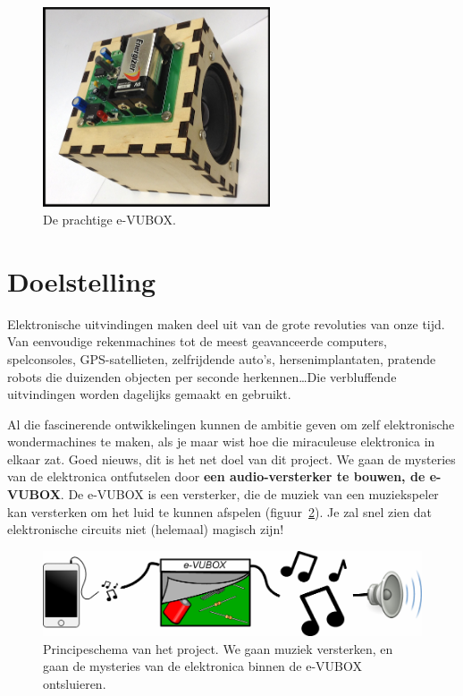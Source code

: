 \documentclass{article}
\begin{document}
	
	\maketitle

	\begin{figure}[htbp]
		\centering
		\includegraphics[width=0.6\textwidth]{foto.jpg}
		\caption{De prachtige e-VUBOX.}
		\label{fig:foto}
	\end{figure}

	\clearpage
	\tableofcontents
	\clearpage

	\section{Doelstelling}
		Elektronische uitvindingen maken deel uit van de grote revoluties van onze tijd. Van eenvoudige rekenmachines tot de meest geavanceerde computers, spelconsoles, GPS-satellieten, zelfrijdende auto's, hersenimplantaten, pratende robots die duizenden objecten per seconde herkennen\ldots Die verbluffende uitvindingen worden dagelijks gemaakt en gebruikt.

		Al die fascinerende ontwikkelingen kunnen de ambitie geven om zelf elektronische wondermachines te maken, als je maar wist hoe die miraculeuse elektronica in elkaar zat. Goed nieuws, dit is het net doel van dit project. We gaan de mysteries van de elektronica ontfutselen door \textbf{een audio-versterker te bouwen, de e-VUBOX}. De e-VUBOX is een versterker, die de muziek van een  muziekspeler kan versterken om het luid te kunnen afspelen (figuur~\ref{fig:principe}). Je zal snel zien dat elektronische circuits niet (helemaal) magisch zijn!

		\begin{figure}[htbp]
			\centering
			\includegraphics[scale=0.85]{principe}
			\caption{Principeschema van het project. We gaan muziek versterken, en gaan de mysteries van de elektronica binnen de e-VUBOX ontsluieren.}
			\label{fig:principe}
		\end{figure}
\end{document}
